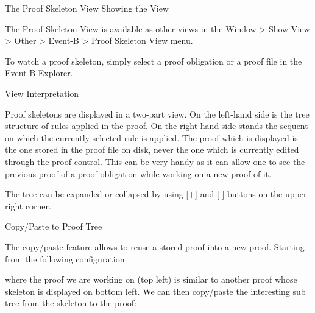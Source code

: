 The Proof Skeleton View
Showing the View

The Proof Skeleton View is available as other views in the Window > Show View > Other > Event-B > Proof Skeleton View menu.

To watch a proof skeleton, simply select a proof obligation or a proof file in the Event-B Explorer.

View Interpretation

Proof skeletons are displayed in a two-part view. On the left-hand side is the tree structure of rules applied in the proof. On the right-hand side stands the sequent on which the currently selected rule is applied. The proof which is displayed is the one stored in the proof file on disk, never the one which is currently edited through the proof control. This can be very handy as it can allow one to see the previous proof of a proof obligation while working on a new proof of it. 


The tree can be expanded or collapsed by using [+] and [-] buttons on the upper right corner.

Copy/Paste to Proof Tree

The copy/paste feature allows to reuse a stored proof into a new proof. Starting from the following configuration: 


where the proof we are working on (top left) is similar to another proof whose skeleton is displayed on bottom left. We can then copy/paste the interesting sub tree from the skeleton to the proof: 


